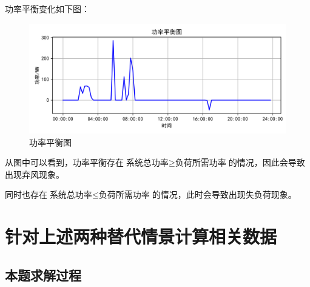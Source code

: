 \documentclass{cumcmthesis}
\begin{document}
	功率平衡变化如下图：
\begin{figure}[H]
	\centering
	\includegraphics[width=1\linewidth]{figures/第三题：功率平衡图}
	\caption{功率平衡图}
	\label{fig:}
\end{figure}

	从图中可以看到，功率平衡存在$ \texttt{系统总功率}\geq \texttt{负荷所需功率}$的情况，因此会导致出现弃风现象。
	
	同时也存在$ \texttt{系统总功率}\leq \texttt{负荷所需功率}$的情况，此时会导致出现失负荷现象。
	
	 \newpage
	\section{针对上述两种替代情景计算相关数据}
	\subsection{本题求解过程}
\end{document}
